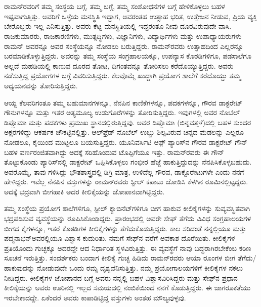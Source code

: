 
\chapter{}


ರಾಮನ್‍ರವರಿಗೆ ತಮ್ಮ ಸಂಸ್ಥೆಯ ಬಗ್ಗೆ, ತಮ್ಮ ಬಗ್ಗೆ, ತಮ್ಮ ಸಂಶೋಧನೆಗಳ ಬಗ್ಗೆ ಹೇಳಿಕೊಳ್ಳಲು ಬಹಳ ಇಷ್ಟವಾಗುತ್ತಿತ್ತು. ಅವರಿಗೆ ಒಳ್ಳೆಯ ಮನಸ್ಥಿತಿ ಇದ್ದಾಗ, ಅವರಂತಹ ಉತ್ಸಾಹ ಭರಿತ, ಉತ್ತೇಜನ ನೀಡುವ, ಪ್ರಿಯ ವ್ಯಕ್ತಿ ಬೇರೊಬ್ಬರು ಇಲ್ಲ ಎನಿಸುತ್ತಿತ್ತು. ಅವರು ಕೆಟ್ಟ ಮನಸ್ಥಿತಿಯಲ್ಲಿ ಇದ್ದರಂತೂ ನೀವು ದೂರವಿರುವುದೇ ವಾಸಿ. ರಾಜಕುಮಾರರು, ರಾಜಕಾರಣಿಗಳು, ಮುತ್ಸದ್ಧಿಗಳು, ವಿಜ್ಞಾನಿಗಳು, ವಿದ್ಯಾರ್ಥಿಗಳು ಮತ್ತು ಉಪಾಧ್ಯಾಯರುಗಳು ರಾಮನ್ ಅವರನ್ನೂ ಅವರ ಸಂಸ್ಥೆಯನ್ನೂ ನೋಡಲು ಬರುತ್ತಿದ್ದರು. ರಾಮನ್‍ರವರು ಉತ್ಸಾಹದಿಂದ ಎಲ್ಲರನ್ನೂ ಬರಮಾಡಿಕೊಳ್ಳುತ್ತಿದ್ದರು. ಅವರನ್ನು ತಮ್ಮ ಸಂಸ್ಥೆಯ ಸಂಗ್ರಹಾಲಯಕ್ಕೂ, ಉಪನ್ಯಾಸ ಕೊಠಡಿಗಳಿಗೂ, ಪಡಸಾಲೆಗೂ ಅಲ್ಲದೆ ಮಹಡಿಯಲ್ಲಿ ಕಾಣುವ ದೂರದ ತೋಟ, ದಿಗಂತವನ್ನೂ ತೋರಿಸಲು ಕರೆದೊಯ್ಯುತ್ತಿದ್ದರು. ಅವರು ನಡೆಸುತ್ತಿದ್ದ ಪ್ರಯೋಗಗಳ ಬಗ್ಗೆ ವಿವರಿಸುತ್ತಿದ್ದರು. ಕೆಲವೊಮ್ಮೆ ಖುದ್ದಾಗಿ ಪ್ರಯೋಗ ಶಾಲೆಗೆ ಕರೆದೊಯ್ದು ತಮ್ಮ ಅಧ್ಯಯನವನ್ನು ತೋರಿಸುತ್ತಿದ್ದರು.

ಆಯ್ದ ಕೆಲವರಿಗಂತೂ ತಮ್ಮ ಬಹುಮಾನಗಳನ್ನೂ, ನೆನಪಿನ ಕಾಣಿಕೆಗಳನ್ನೂ, ಪದಕಗಳನ್ನೂ, ಗೌರವ ಡಾಕ್ಟರೇಟ್ ಗೌನುಗಳನ್ನೂ ಮತ್ತು ಇತರ ಅತ್ಯಮೂಲ್ಯ ಉಡುಗೊರೆಗಳನ್ನು ತೋರಿಸುತ್ತಿದ್ದರು. ಇವುಗಳಲ್ಲಿ ಅವರ ನೊಬೆಲ್ ಡಿಪ್ಲೊಮಾ ಮತ್ತು ಪದಕ‍ಗಳು ಪ್ರಮುಖ ಸ್ಥಾನದಲ್ಲಿರುತ್ತಿದ್ದವು. ಅವರ ಡಿಪ್ಲೊಮಾ (ಬಿನ್ನವತ್ತಳೆ)ದಲ್ಲಿ ಬಹಳ ಸುಂದರ ಅಕ್ಷರಗಳಿದ್ದು ಆಕರ್ಷಕ ಚೌಕಟ್ಟಿನಲ್ಲಿತ್ತು. ಆಲ್‍ಫ್ರೆಡ್ ನೊಬೆಲ್ ಉಬ್ಬು ಶಿಲ್ಪವಿರುವ ಚಿನ್ನದ ಮೆಡಲನ್ನು ಎಲ್ಲರೂ ನೋಡಲೂ, ಕೈಯಿಂದ ಮುಟ್ಟಲೂ ಬಯಸುತ್ತಿದ್ದರು. ಯೂನಿವರ್ಸಿಟಿ ಆಫ಼್ ಪ್ಯಾರಿಸ್‍ನ ಗೌರವ ಡಾಕ್ಟರೇಟ್ ಗೌನ್ ಬಹಳ ವರ್ಣರಂಜಿತವಾಗಿದ್ದು ಅದಕ್ಕೆ ಸರಿಹೊಂದುವ ಟೊಪ್ಪಿಗೆಯೂ ಇತ್ತು. ರಾಮನ್‍ರವರು ಈ ಗೌನ್ ತೊಟ್ಟುಕೊಂಡು ಪ್ಯಾರಿಸ್‍ನಲ್ಲಿ ಡಾಕ್ಟರೇಟ್ ಒಪ್ಪಿಸಿಕೊಳ್ಳಲು ಗಂಭೀರ ಹೆಜ್ಜೆ ಹಾಕುತ್ತಿದ್ದುದನ್ನು ನೆನಪಿಸಿಕೊಳ್ಳಬಹುದು. ಅವರೊಮ್ಮೆ, ತಾವು ಗಳಿಸಿದ್ದು ಭೌತಶಾಸ್ತ್ರದಲ್ಲಿ ಡಿಗ್ರಿ ಮಾತ್ರ, ಉಳಿದೆಲ್ಲ ಗೌರವ, ಡಾಕ್ಟೊರೇಟುಗಳೇ ಎಂದು ನನಗೆ ಹೇಳಿದ್ದರು. ಇವೆಲ್ಲ ನೆನಪಿನ ವಸ್ತುಗಳನ್ನು ರಾಮನ್‍ರವರು ಸ್ಟೀಲ್ ಕಪಾಟು ಜೋಡಿಸಿ ಕೆಳಗಿನ ರೂಮಿನಲ್ಲಿಟ್ಟದ್ದರು. ಅದಕ್ಕೆ ಭದ್ರವಾಗಿ ಬೀಗಹಾಕಿ ಅದರ ಕೀಲಿಕೈಯನ್ನು ಜೋಪಾನವಾಗಿಟ್ಟಿದ್ದರು.

ತಮ್ಮ ಸಂಸ್ಥೆಯ ಪ್ರಯೋಗ ಶಾಲೆಗಳಿಗೂ, ಸ್ಟೀಲ್ ಕ್ಯಾಬಿನೆಟ್‍ಗಳಿಗೂ ಬೀಗ ಹಾಕುವ ಕೀಲಿಕೈ\-ಗಳನ್ನು ಸುವ್ಯವಸ್ಥಿತವಾಗಿ ಭದ್ರಪಡಿಸುವ ವ್ಯವಸ್ಥೆಯನ್ನು ರೂಪಿಸಿಕೊಂಡಿದ್ದರು. ಪ್ರಾರಂಭದಲ್ಲಿ ಅವರೇ ಸೇಫ್ ತೆಗೆದು ವಿವಿಧ ಸಂಗ್ರಹಾಲಯಗಳ ಬೀಗದ ಕೈಗಳನ್ನೂ, ಇತರೆ ಕೊಠಡಿಗಳ ಕೀಲಿಕೈಗಳನ್ನು ತೆಗೆದುಕೊಡುತ್ತಿದ್ದರು. ಕಾಲ ಸರಿದಂತೆ ನನ್ನಲ್ಲಿಯೂ ಮತ್ತು ಪದ್ಮನಾಭನ್\break ಅವರಲ್ಲಿಯೂ ವಿಶ್ವಾಸ ಕುದುರಿತು. ನಮಗೆ ಸೇಫ್‍ನ ವರೆಗೆ ಅವಕಾಶ ದೊರೆಯಿತು. ಕೀಲಿಕೈಗಳ ಪ್ರತಿಯೊಂದು ಗುಚ್ಛಕ್ಕೂ ಅದರದ್ದೇ ಆದ ನಿರ್ಧಾರಿತ ಸ್ಥಳವಿರುತ್ತಿತ್ತು. ಈ ವ್ಯವಸ್ಥೆಗೆ ನಾವು ಬದ್ಧರಾಗಿರಬೇಕೆಂಬ ಕಠಿಣ ಸೂಚನೆ ಇರುತ್ತಿತ್ತು. ಸಂದರ್ಶಕರು ಬಂದಾಗ ಕೀಲಿಕೈ ಗುಚ್ಛ ಹಿಡಿದು ರಾಮನ್‍ರವರು ಆಯಾ ರೂಂಗಳ ಬೀಗ ತೆಗೆದು/ಹಾಕುವುದನ್ನು ನೋಡುವುದೇ ಒಂದು ರಮ್ಯ ದೃಶ್ಯವೆನಿಸುತ್ತಿತ್ತು. ನಮ್ಮ ಪ್ರಯೋಗಾಲಯಗಳಿಗೆ ಕೀಲಿಕೈಗಳ ನಕಲು ನೀಡಿದ್ದರು. ಕೀಲಿಕೈಗಳ ಜೋಪಾನದ ಬಗ್ಗೆ ಅವರು ನನ್ನಲ್ಲಿ ಬಹಳ ವಿಶ್ವಾಸವಿರಿಸಿದ್ದರು ಮತ್ತು ಸೇಫ್‍ನ ಪ್ರಧಾನ ಕೀಲಿಕೈಯನ್ನು ಅವರು ಊರಿನಲ್ಲಿ ಇಲ್ಲದ ಸಮಯದಲ್ಲಿ ನಂಬಿಕೆಯಿಂದ ನನಗೆ ಕೊಡುತ್ತಿದ್ದರು. ಈ ಜಾಗರೂಕತೆಯು ಇರಬೇಕಾದದ್ದೇ. ಏಕೆಂದರೆ ಅವರು ಕಾಪಾಡಿಟ್ಟಿದ್ದ ವಸ್ತುಗಳು ಅಂತಹ ಮೌಲ್ಯವುಳ್ಳವು.

